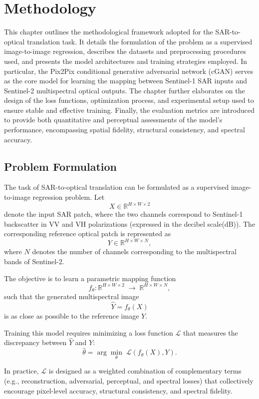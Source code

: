 \chapter{Methodology}
This chapter outlines the methodological framework adopted for the SAR-to-optical translation task. It details the formulation of the problem as a supervised image-to-image regression, describes the datasets and preprocessing procedures used, and presents the model architectures and training strategies employed. In particular, the Pix2Pix conditional generative adversarial network (cGAN) serves as the core model for learning the mapping between Sentinel-1 SAR inputs and Sentinel-2 multispectral optical outputs. The chapter further elaborates on the design of the loss functions, optimization process, and experimental setup used to ensure stable and effective training. Finally, the evaluation metrics are introduced to provide both quantitative and perceptual assessments of the model’s performance, encompassing spatial fidelity, structural consistency, and spectral accuracy.
\section{Problem Formulation}

The task of SAR-to-optical translation can be formulated as a supervised image-to-image regression problem. Let
\[
    X \in \mathbb{R}^{H \times W \times 2}
\]
denote the input SAR patch, where the two channels correspond to Sentinel-1 backscatter in VV and VH polarizations (expressed in the decibel scale(dB)). The corresponding reference optical patch is represented as
\[
    Y \in \mathbb{R}^{H \times W \times N},
\]
where \(N\) denotes the number of channels corresponding to the multispectral bands of {Sentinel-2}.

The objective is to learn a parametric mapping function
\[
    f_\theta : \mathbb{R}^{H \times W \times 2} \; \rightarrow \; \mathbb{R}^{H \times W \times N},
\]
such that the generated multispectral image
\[
    \hat{Y} = f_\theta(X)
\]
is as close as possible to the reference image \( Y \).

Training this model requires minimizing a loss function \(\mathcal{L}\) that measures the discrepancy between \(\hat{Y}\) and \(Y\):
\[
    \hat{\theta} = \arg\min_\theta \; \mathcal{L}(f_\theta(X), Y).
\]

In practice, \(\mathcal{L}\) is designed as a weighted combination of complementary terms (e.g., reconstruction, adversarial, perceptual, and spectral losses) that collectively encourage pixel-level accuracy, structural consistency, and spectral fidelity.

